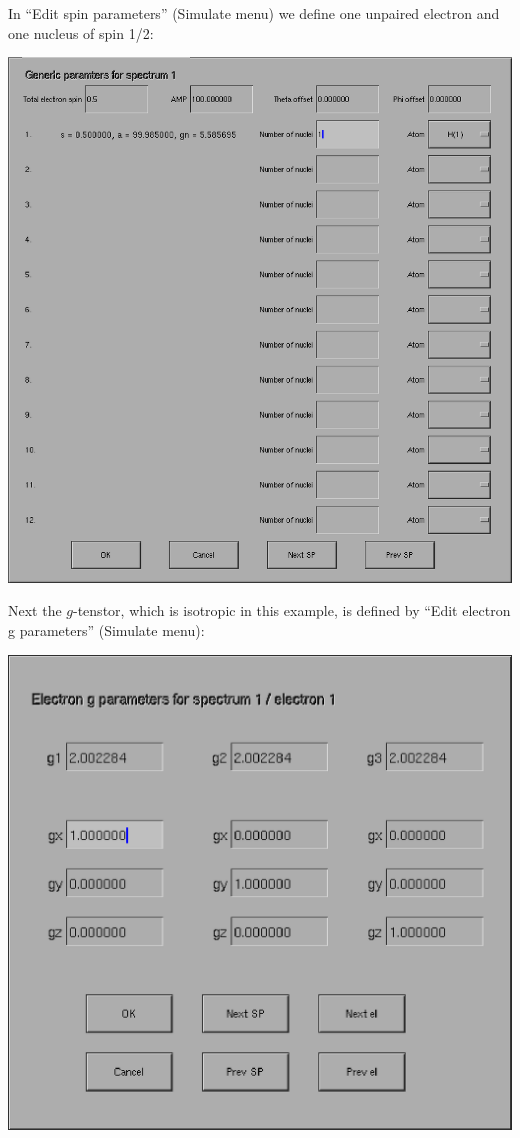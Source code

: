 \documentclass[byrevtex,amssymb,aps,pra,floatfix,letterpaper]{revtex4}
\begin{document}
\noindent
In ``Edit spin parameters'' (Simulate menu) we define one unpaired electron and one nucleus of spin 1/2:

\begin{center}
\includegraphics[scale=0.3]{fig3}
\end{center}

\noindent
Next the $g$-tenstor, which is isotropic in this example, is defined by ``Edit electron g parameters'' (Simulate menu):

\begin{center}
\includegraphics[scale=0.4]{fig4}
\end{center}
\end{document}
